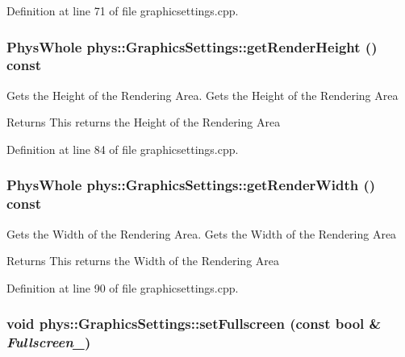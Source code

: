 Definition at line 71 of file graphicsettings.cpp.\hypertarget{classphys_1_1GraphicsSettings_a4e9df38f338a0b660f68c716a6b4a223}{
\subsubsection[{getRenderHeight}]{\setlength{\rightskip}{0pt plus 5cm}PhysWhole phys::GraphicsSettings::getRenderHeight () const}}
\label{dc/df1/classphys_1_1GraphicsSettings_a4e9df38f338a0b660f68c716a6b4a223}


Gets the Height of the Rendering Area. Gets the Height of the Rendering Area \begin{DoxyReturn}{Returns}
This returns the Height of the Rendering Area 
\end{DoxyReturn}


Definition at line 84 of file graphicsettings.cpp.\hypertarget{classphys_1_1GraphicsSettings_aca019a830353f95f69c27c147c52dd03}{
\subsubsection[{getRenderWidth}]{\setlength{\rightskip}{0pt plus 5cm}PhysWhole phys::GraphicsSettings::getRenderWidth () const}}
\label{dc/df1/classphys_1_1GraphicsSettings_aca019a830353f95f69c27c147c52dd03}


Gets the Width of the Rendering Area. Gets the Width of the Rendering Area \begin{DoxyReturn}{Returns}
This returns the Width of the Rendering Area 
\end{DoxyReturn}


Definition at line 90 of file graphicsettings.cpp.\hypertarget{classphys_1_1GraphicsSettings_aba9e127ab2cf3f20604313e39d32f7a8}{
\subsubsection[{setFullscreen}]{\setlength{\rightskip}{0pt plus 5cm}void phys::GraphicsSettings::setFullscreen (const bool \& {\em Fullscreen\_\-})}}
\label{dc/df1/classphys_1_1GraphicsSettings_aba9e127ab2cf3f20604313e39d32f7a8}


